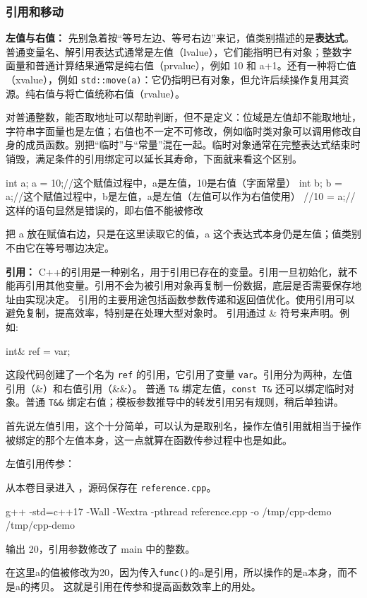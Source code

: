 \subsubsection{引用和移动}
\textbf{左值与右值：}
先别急着按“等号左边、等号右边”来记，值类别描述的是\textbf{表达式}。普通变量名、解引用表达式通常是左值（lvalue），它们能指明已有对象；整数字面量和普通计算结果通常是纯右值（prvalue），例如 10 和 a+1。还有一种将亡值（xvalue），例如 \texttt{std::move(a)}：它仍指明已有对象，但允许后续操作复用其资源。纯右值与将亡值统称右值（rvalue）。

对普通整数，能否取地址可以帮助判断，但不是定义：位域是左值却不能取地址，字符串字面量也是左值；右值也不一定不可修改，例如临时类对象可以调用修改自身的成员函数。别把“临时”与“常量”混在一起。临时对象通常在完整表达式结束时销毁，满足条件的引用绑定可以延长其寿命，下面就来看这个区别。
\begin{tcode}
int a;
a = 10;//这个赋值过程中，a是左值，10是右值（字面常量）
int b;
b = a;//这个赋值过程中，b是左值，a是左值（左值可以作为右值使用）
//10 = a;//这样的语句显然是错误的，即右值不能被修改
\end{tcode}
把 a 放在赋值右边，只是在这里读取它的值，a 这个表达式本身仍是左值；值类别不由它在等号哪边决定。

\textbf{引用：}
C++的引用是一种别名，用于引用已存在的变量。引用一旦初始化，就不能再引用其他变量。引用不会为被引用对象再复制一份数据，底层是否需要保存地址由实现决定。
引用的主要用途包括函数参数传递和返回值优化。使用引用可以避免复制，提高效率，特别是在处理大型对象时。
引用通过 \& 符号来声明。例如:
\begin{tcode}
int& ref = var;
\end{tcode}
这段代码创建了一个名为 \texttt{ref} 的引用，它引用了变量 \texttt{var}。引用分为两种，左值引用（\&）和右值引用（\&\&）。
普通 \texttt{T\&} 绑定左值，\texttt{const T\&} 还可以绑定临时对象。普通 \texttt{T\&\&} 绑定右值；模板参数推导中的转发引用另有规则，稍后单独讲。

首先说左值引用，这个十分简单，可以认为是取别名，操作左值引用就相当于操作被绑定的那个左值本身，这一点就算在函数传参过程中也是如此。
\begin{example}
左值引用传参：



从本卷目录进入 ，源码保存在 \texttt{reference.cpp}。
\begin{tbash}
g++ -std=c++17 -Wall -Wextra -pthread reference.cpp -o /tmp/cpp-demo
/tmp/cpp-demo
\end{tbash}
输出 20，引用参数修改了 main 中的整数。
\end{example}
在这里a的值被修改为20，因为传入\texttt{func()}的a是引用，所以操作的是a本身，而不是a的拷贝。
这就是引用在传参和提高函数效率上的用处。

